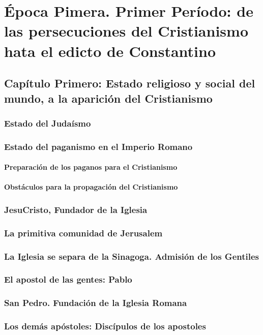 \raggedbottom{} \documentclass[12pt, a4paper]{book}
\begin{document}
\part{Época Pimera. Primer Período: de las persecuciones del Cristianismo hata el edicto de Constantino}
\chapter{Capítulo Primero: Estado religioso y social del mundo, a la aparición del Cristianismo}
\section{Estado del Judaísmo}
\section{Estado del paganismo en el Imperio Romano}
\subsection{Preparación de los paganos para el Cristianismo}
\subsection{Obstáculos para la propagación del Cristianismo}
\section{JesuCristo, Fundador de la Iglesia}
\section{La primitiva comunidad de Jerusalem}
\section{La Iglesia se separa de la Sinagoga. Admisión de los Gentiles}
\section{El apostol de las gentes: Pablo}
\section{San Pedro. Fundación de la Iglesia Romana}
\section{Los demás apóstoles: Discípulos de los apostoles}
\end{document}
